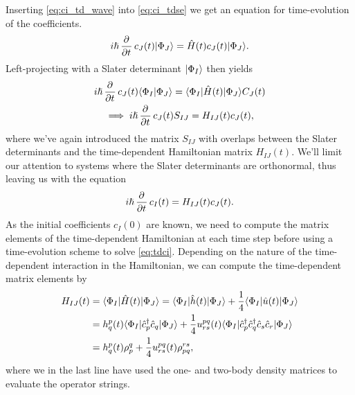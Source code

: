         Inserting \autoref{eq:ci_td_wave} into \autoref{eq:ci_tdse} we get an
        equation for time-evolution of the coefficients.
        \begin{align}
            i\hslash \dpd[]{}{t}c_{J}(t)\ket{\Phi_J}
            = \hamil(t) c_{J}(t)\ket{\Phi_J}.
        \end{align}
        Left-projecting with a Slater determinant $| \Phi_I \rangle$ then yields
        \begin{gather}
            i\hslash \dpd[]{}{t}c_{J}(t)\braket{\Phi_I}{\Phi_J}
            = \bra{\Phi_I}\hamil(t)\ket{\Phi_J} C_{J}(t) \\
            \implies
            i\hslash \dpd[]{}{t}c_{J}(t) S_{IJ}
            = H_{IJ}(t) c_{J}(t),
        \end{gather}
        where we've again introduced the matrix $S_{IJ}$ with overlaps between
        the Slater determinants and the time-dependent Hamiltonian matrix
        $H_{IJ}(t)$.
        We'll limit our attention to systems where the Slater determinants are
        orthonormal, thus leaving us with the equation
        \begin{align}
            i\hslash \dpd[]{}{t}c_{I}(t)
            = H_{IJ}(t) c_{J}(t).
            \label{eq:tdci}
        \end{align}
        As the initial coefficients $c_{I}(0)$ are known, we need to compute the
        matrix elements of the time-dependent Hamiltonian at each time step
        before using a time-evolution scheme to solve \autoref{eq:tdci}.
        Depending on the nature of the time-dependent interaction in the
        Hamiltonian, we can compute the time-dependent matrix elements by
        \begin{align}
            H_{IJ}(t)
            &= \langle \Phi_I |\hat{H}(t)| \Phi_J \rangle
            = \langle \Phi_I |\hat{h}(t)| \Phi_J \rangle
            + \frac{1}{4}\langle \Phi_I |\hat{u}(t)| \Phi_J \rangle
            \\
            &=
            h^{p}_{q}(t)
            \langle \Phi_I |\hat{c}_{p}^{\dagger}\hat{c}_{q}| \Phi_J \rangle
            + \frac{1}{4}u^{pq}_{rs}(t)
            \langle \Phi_I |\hat{c}_{p}^{\dagger}\hat{c}_{q}^{\dagger}\hat{c}_{s}\hat{c}_{r}| \Phi_J \rangle
            \\
            &=
            h^{p}_{q}(t) \rho^{q}_{p}
            + \frac{1}{4} u^{pq}_{rs}(t) \rho^{rs}_{pq},
        \end{align}
        where we in the last line have used the one- and two-body density
        matrices to evaluate the operator strings.

